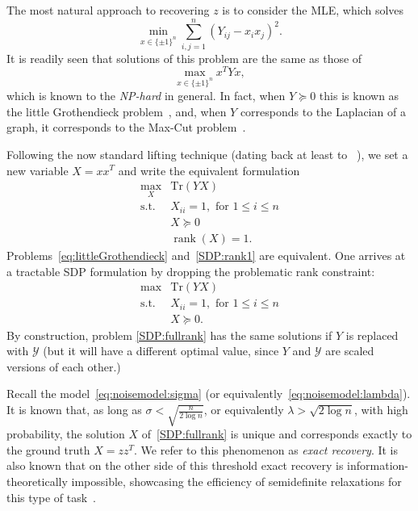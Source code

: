 \documentclass{colt2016} %
\newcommand{\trace}{\mathrm{Tr}}
\newcommand{\rank}{\operatorname{rank}}
\newcommand{\1}{\mathbf{1}}
\newcommand{\YYY}{\mathcal{Y}}
\begin{document}
The most natural approach to recovering $z$ is to consider the MLE, which solves
\begin{equation}
\min_{x\in\{\pm 1\}^n} \sum_{i,j=1}^n \left( Y_{ij} - x_ix_j  \right)^2.
\end{equation}
It is readily seen that solutions of this problem are the same as those of
\begin{equation}\label{eq:littleGrothendieck}
\max_{x\in\{\pm 1\}^n} x^TYx,
\end{equation}
which is known to the \emph{NP-hard} in general. In fact, when $Y\succeq 0$ this is known as the little Grothendieck problem~\citep{briet2014grothendieck,bandeira2013approximating}, and, when $Y$ corresponds to the Laplacian of a graph, it corresponds to the Max-Cut problem~\citep{goemans1995maxcut}.

Following the now standard lifting technique (dating back at least to~\cite{goemans1995maxcut} ), we set a new variable $X = xx^T$ and write the equivalent formulation
\begin{equation}\label{SDP:rank1}
\begin{array}{ll}
\max_X & \trace\left( YX \right) \\
\text{s.t.} & X_{ii} = 1, \text{ for } 1\leq i \leq n\\ 
 & X \succeq 0 \\
 & \rank(X) = 1.
\end{array}
\end{equation}
Problems~\eqref{eq:littleGrothendieck} and~\eqref{SDP:rank1} are equivalent.
One arrives at a tractable SDP formulation by dropping the problematic rank constraint:
\begin{equation}\label{SDP:fullrank}
\begin{array}{ll}
\max & \trace\left( YX \right) \\
\text{s.t.} & X_{ii} = 1, \text{ for } 1\leq i \leq n\\ 
 & X \succeq 0.
\end{array}
\end{equation}
By construction, problem \eqref{SDP:fullrank} has the same solutions if $Y$ is replaced with $\YYY$ (but it will have a different optimal value, since $Y$ and $\YYY$ are scaled versions of each other.)

Recall the model~\eqref{eq:noisemodel:sigma} (or equivalently~\eqref{eq:noisemodel:lambda}). It is known that, as long as $\sigma < \sqrt{\frac{n}{2\log n}}$, or equivalently $\lambda > \sqrt{2\log n}$, with high probability, the solution $X$ of~\eqref{SDP:fullrank} is unique and corresponds exactly to the ground truth $X=zz^T$. We refer to this phenomenon as \emph{exact recovery}. It is also known that on the other side of this threshold exact recovery is information-theoretically impossible, showcasing the efficiency of semidefinite relaxations for this type of task~\citep{bandeira2014tightness,bandeira2015laplacian}.
\end{document}
